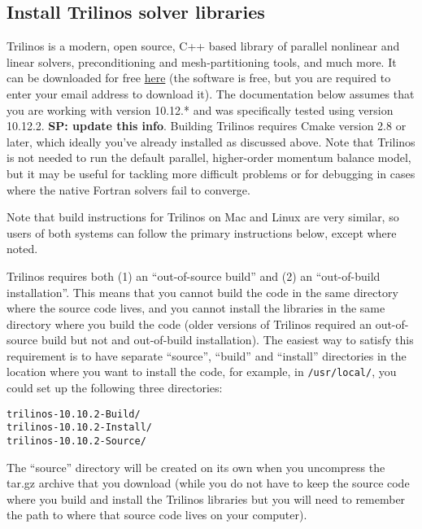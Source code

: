 \subsection{Install Trilinos solver libraries}
Trilinos is a modern, open source, C++ based library of parallel nonlinear and linear solvers, 
preconditioning and mesh-partitioning tools, and much more. It can be downloaded for free 
\href{http://trilinos.sandia.gov/index.html}{here} (the software is free, but you are 
required to enter your email address to download it). The documentation below assumes 
that you are working with version 10.12.* and was specifically tested using version 10.12.2. 
\textbf{SP: update this info}. 
Building Trilinos requires Cmake version 2.8 or later, which ideally you've already 
installed as discussed above. Note that Trilinos is not needed to run the default 
parallel, higher-order momentum balance model, but it may be useful for tackling 
more difficult problems or for debugging in cases where the native Fortran solvers 
fail to converge.

Note that build instructions for Trilinos on Mac and Linux are very similar, so users
of both systems can follow the primary instructions below, except where noted.

Trilinos requires both (1) an ``out-of-source build'' and (2) an ``out-of-build installation''. 
This means that you cannot build the code in the same directory where the source code lives, 
and you cannot install the libraries in the same directory where you build the code 
(older versions of Trilinos required an out-of-source build but not and out-of-build installation). 
The easiest way to satisfy this requirement is to have separate ``source'', ``build'' and 
``install'' directories in the location where you want to install the code, 
for example, in \texttt{/usr/local/}, you could set up the following three directories:

\begin{verbatim}
trilinos-10.10.2-Build/
trilinos-10.10.2-Install/
trilinos-10.10.2-Source/
\end{verbatim}

The ``source'' directory will be created on its own when you uncompress the tar.gz archive 
that you download (while you do not have to keep the source code where you build and install 
the Trilinos libraries but you will need to remember the path to where that source code 
lives on your computer). 

